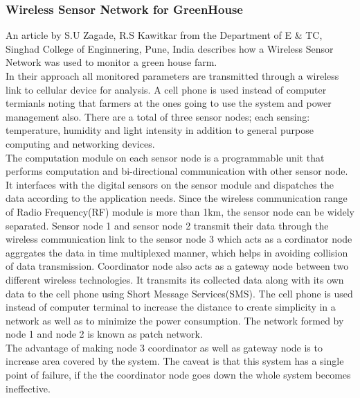 \documentclass[12pt, a4paper]{article}
\begin{document}
\subsubsection{Wireless Sensor Network for GreenHouse}
An article by S.U Zagade, R.S Kawitkar from the Department of E \& TC, Singhad College of Enginnering, Pune, India describes how a Wireless Sensor Network was used to monitor a green house farm.\\
In their approach all monitored parameters are transmitted through a  wireless link to cellular device for analysis. A cell phone is used instead of computer termianls noting that farmers at the ones going to use the system and power management also. There are a total of three sensor nodes; each sensing: temperature, humidity and light intensity in addition to general purpose computing and networking devices.\\
The computation module on each sensor node is a programmable unit that performs computation and bi-directional communication with other sensor node. It interfaces with the digital sensors on the sensor module and dispatches the data according to the application needs. Since the wireless communication range of Radio Frequency(RF) module is more than 1km, the sensor node can be widely separated. Sensor node 1 and sensor node 2 transmit their data through the wireless communication link to the sensor node 3 which acts as a  cordinator node aggrgates the data in time multiplexed manner, which helps in avoiding collision of data transmission. Coordinator node also acts as a gateway node between two different wireless technologies. It transmits its collected data along with its own data to the cell phone using Short Message Services(SMS). The cell phone is used instead of computer terminal to increase the distance to create simplicity in a network as well as to minimize the power consumption. The network formed by node 1 and node 2 is known as patch network.\\
The advantage of making node 3 coordinator as well as gateway node is to increase area covered by the system. The caveat is that this system has a single point of failure, if the the coordinator node goes down the whole system becomes ineffective.  
\end{document}
